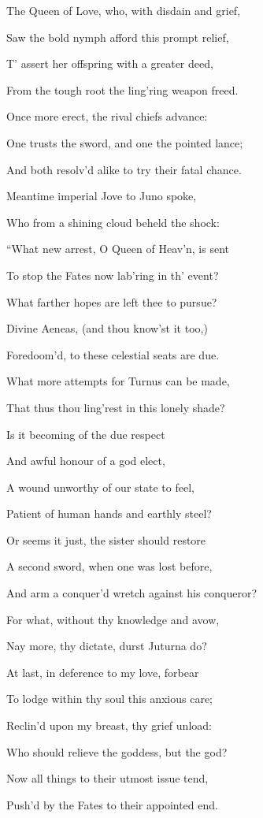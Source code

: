 The Queen of Love, who, with disdain and grief,

Saw the bold nymph afford this prompt relief,

T’ assert her offspring with a greater deed,

From the tough root the ling’ring weapon freed.

Once more erect, the rival chiefs advance:

One trusts the sword, and one the pointed lance;

And both resolv’d alike to try their fatal chance.

Meantime imperial Jove to Juno spoke,

Who from a shining cloud beheld the shock:

“What new arrest, O Queen of Heav’n, is sent

To stop the Fates now lab’ring in th’ event?

What farther hopes are left thee to pursue?

Divine Aeneas, (and thou know’st it too,)

Foredoom’d, to these celestial seats are due.

What more attempts for Turnus can be made,

That thus thou ling’rest in this lonely shade?

Is it becoming of the due respect

And awful honour of a god elect,

A wound unworthy of our state to feel,

Patient of human hands and earthly steel?

Or seems it just, the sister should restore

A second sword, when one was lost before,

And arm a conquer’d wretch against his conqueror?

For what, without thy knowledge and avow,

Nay more, thy dictate, durst Juturna do?

At last, in deference to my love, forbear

To lodge within thy soul this anxious care;

Reclin’d upon my breast, thy grief unload:

Who should relieve the goddess, but the god?

Now all things to their utmost issue tend,

Push’d by the Fates to their appointed end.

